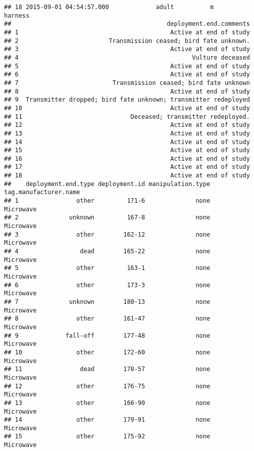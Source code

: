 \documentclass[
]{article}
\begin{document}
\begin{verbatim}
## 18 2015-09-01 04:54:57.000             adult          m         harness
##                                           deployment.end.comments
## 1                                          Active at end of study
## 2                         Transmission ceased; bird fate unknown.
## 3                                          Active at end of study
## 4                                                Vulture deceased
## 5                                          Active at end of study
## 6                                          Active at end of study
## 7                          Transmission ceased; bird fate unknown
## 8                                          Active at end of study
## 9  Transmitter dropped; bird fate unknown; transmitter redeployed
## 10                                         Active at end of study
## 11                              Deceased; transmitter redeployed.
## 12                                         Active at end of study
## 13                                         Active at end of study
## 14                                         Active at end of study
## 15                                         Active at end of study
## 16                                         Active at end of study
## 17                                         Active at end of study
## 18                                         Active at end of study
##    deployment.end.type deployment.id manipulation.type tag.manufacturer.name
## 1                other         171-6              none             Microwave
## 2              unknown         167-8              none             Microwave
## 3                other        162-12              none             Microwave
## 4                 dead        165-22              none             Microwave
## 5                other         163-1              none             Microwave
## 6                other         173-3              none             Microwave
## 7              unknown        180-13              none             Microwave
## 8                other        161-47              none             Microwave
## 9             fall-off        177-48              none             Microwave
## 10               other        172-60              none             Microwave
## 11                dead        178-57              none             Microwave
## 12               other        176-75              none             Microwave
## 13               other        166-90              none             Microwave
## 14               other        179-91              none             Microwave
## 15               other        175-92              none             Microwave

\end{verbatim}
\end{document}
